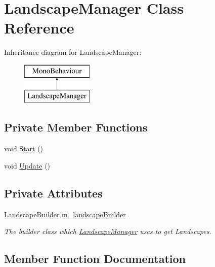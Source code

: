 \hypertarget{class_landscape_manager}{}\section{Landscape\+Manager Class Reference}
\label{class_landscape_manager}
Inheritance diagram for Landscape\+Manager\+:\begin{figure}[H]
\begin{center}
\leavevmode
\includegraphics[height=2.000000cm]{class_landscape_manager}
\end{center}
\end{figure}
\subsection*{Private Member Functions}
\begin{DoxyCompactItemize}
\item 
void \hyperlink{class_landscape_manager_a5954eb34a23ac9f409c883b0a4bac033}{Start} ()
\item 
void \hyperlink{class_landscape_manager_afa615d6914c117affbe6b97e0b552502}{Update} ()
\end{DoxyCompactItemize}
\subsection*{Private Attributes}
\begin{DoxyCompactItemize}
\item 
\hyperlink{class_landscape_builder}{Landscape\+Builder} \hyperlink{class_landscape_manager_aa8cb7cbe6921ddb36a5aa73864556a56}{m\+\_\+landscape\+Builder}
\begin{DoxyCompactList}\small\item\em The builder class which \hyperlink{class_landscape_manager}{Landscape\+Manager} uses to get Landscapes. \end{DoxyCompactList}\end{DoxyCompactItemize}


\subsection{Member Function Documentation}
\mbox{\label{class_landscape_manager_a5954eb34a23ac9f409c883b0a4bac033}} 
